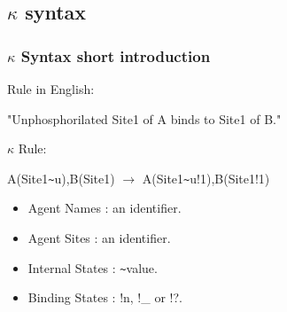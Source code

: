 \documentclass[xcolor=dvipsnames]{beamer}
\def\int{\hbox{\texttt{\~}}}
\begin{document}
\subsection{$\kappa$ syntax}
\begin{frame}
  \frametitle{$\kappa$ Syntax short introduction}
  \begin{flushleft}
    Rule in English:
    \item "Unphosphorilated Site1 of A binds to Site1 of B."
    \newline \pause
    \item $\kappa$ Rule:
    \item A(Site1\int u),B(Site1) $\rightarrow$ A(Site1\int u!1),B(Site1!1)
    \newline \pause
    \begin{itemize}
      \item Agent Names     : an identifier.
      \item Agent Sites     : an identifier.
      \item Internal States : \int \textlangle value\textrangle.
      \item Binding States  : !\textlangle n\textrangle, !\_ or !?.
    \end{itemize}
  \end{flushleft}
\end{frame}
\end{document}
